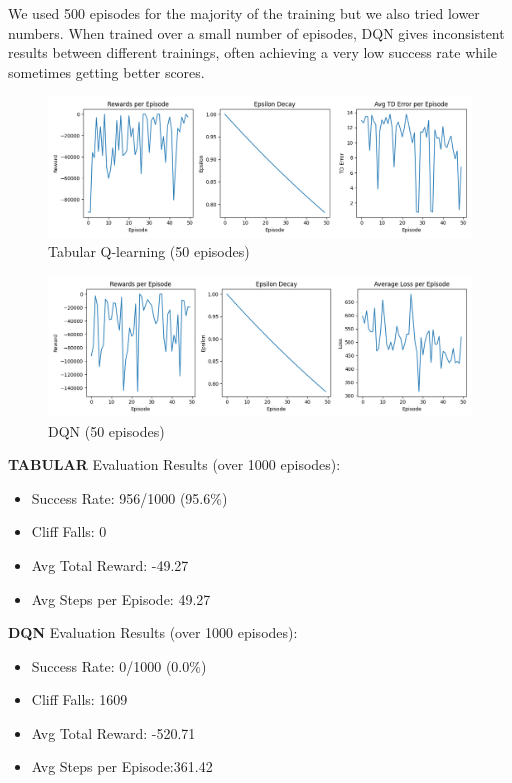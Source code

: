 \documentclass[a4paper,12pt]{article}
\begin{document}
\noindent We used 500 episodes for the majority of the training but we also tried lower numbers. When trained over a small number of episodes, DQN gives inconsistent results between different trainings, often achieving a very low success rate while sometimes getting better scores.\\

\begin{figure}[H]
    \centering
    \includegraphics[width=\linewidth]{plot_tabular_50ep.png}
    \caption{Tabular Q-learning (50 episodes)}
\end{figure}
\begin{figure}[H]
    \centering
    \includegraphics[width=\linewidth]{plot_dqn_50ep.png}
    \caption{DQN (50 episodes)}
\end{figure}
\noindent \textbf{TABULAR} Evaluation Results (over 1000 episodes):
\begin{itemize}
    \item Success Rate: 956/1000 (95.6\%)
    \item Cliff Falls: 0
    \item Avg Total Reward: -49.27
    \item Avg Steps per Episode: 49.27
\end{itemize}
\textbf{DQN} Evaluation Results (over 1000 episodes):
\begin{itemize}
    \item Success Rate: 0/1000 (0.0\%)
    \item Cliff Falls: 1609
    \item Avg Total Reward: -520.71
    \item Avg Steps per Episode:361.42
\end{itemize}
\end{document}
